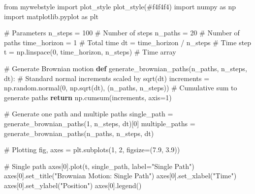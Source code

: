 \documentclass[
  letterpaper,
  DIV=11,
  numbers=noendperiod]{scrartcl}
\newenvironment{Shaded}{\begin{snugshade}}{\end{snugshade}}
\newcommand{\CommentTok}[1]{\textcolor[rgb]{0.37,0.37,0.37}{#1}}
\newcommand{\ControlFlowTok}[1]{\textcolor[rgb]{0.00,0.23,0.31}{\textbf{#1}}}
\newcommand{\DecValTok}[1]{\textcolor[rgb]{0.68,0.00,0.00}{#1}}
\newcommand{\FloatTok}[1]{\textcolor[rgb]{0.68,0.00,0.00}{#1}}
\newcommand{\ImportTok}[1]{\textcolor[rgb]{0.00,0.46,0.62}{#1}}
\newcommand{\KeywordTok}[1]{\textcolor[rgb]{0.00,0.23,0.31}{\textbf{#1}}}
\newcommand{\NormalTok}[1]{\textcolor[rgb]{0.00,0.23,0.31}{#1}}
\newcommand{\OperatorTok}[1]{\textcolor[rgb]{0.37,0.37,0.37}{#1}}
\newcommand{\StringTok}[1]{\textcolor[rgb]{0.13,0.47,0.30}{#1}}
\begin{document}
\begin{Shaded}
\begin{Highlighting}[]
\ImportTok{from}\NormalTok{ mywebstyle }\ImportTok{import}\NormalTok{ plot\_style}
\NormalTok{plot\_style(}\StringTok{\textquotesingle{}\#f4f4f4\textquotesingle{}}\NormalTok{)}
\ImportTok{import}\NormalTok{ numpy }\ImportTok{as}\NormalTok{ np}
\ImportTok{import}\NormalTok{ matplotlib.pyplot }\ImportTok{as}\NormalTok{ plt}

\CommentTok{\# Parameters}
\NormalTok{n\_steps }\OperatorTok{=} \DecValTok{100}  \CommentTok{\# Number of steps}
\NormalTok{n\_paths }\OperatorTok{=} \DecValTok{20}   \CommentTok{\# Number of paths}
\NormalTok{time\_horizon }\OperatorTok{=} \DecValTok{1}  \CommentTok{\# Total time}
\NormalTok{dt }\OperatorTok{=}\NormalTok{ time\_horizon }\OperatorTok{/}\NormalTok{ n\_steps  }\CommentTok{\# Time step}
\NormalTok{t }\OperatorTok{=}\NormalTok{ np.linspace(}\DecValTok{0}\NormalTok{, time\_horizon, n\_steps)  }\CommentTok{\# Time array}

\CommentTok{\# Generate Brownian motion}
\KeywordTok{def}\NormalTok{ generate\_brownian\_paths(n\_paths, n\_steps, dt):}
    \CommentTok{\# Standard normal increments scaled by sqrt(dt)}
\NormalTok{    increments }\OperatorTok{=}\NormalTok{ np.random.normal(}\DecValTok{0}\NormalTok{, np.sqrt(dt), (n\_paths, n\_steps))}
    \CommentTok{\# Cumulative sum to generate paths}
    \ControlFlowTok{return}\NormalTok{ np.cumsum(increments, axis}\OperatorTok{=}\DecValTok{1}\NormalTok{)}

\CommentTok{\# Generate one path and multiple paths}
\NormalTok{single\_path }\OperatorTok{=}\NormalTok{ generate\_brownian\_paths(}\DecValTok{1}\NormalTok{, n\_steps, dt)[}\DecValTok{0}\NormalTok{]}
\NormalTok{multiple\_paths }\OperatorTok{=}\NormalTok{ generate\_brownian\_paths(n\_paths, n\_steps, dt)}

\CommentTok{\# Plotting}
\NormalTok{fig, axes }\OperatorTok{=}\NormalTok{ plt.subplots(}\DecValTok{1}\NormalTok{, }\DecValTok{2}\NormalTok{, figsize}\OperatorTok{=}\NormalTok{(}\FloatTok{7.9}\NormalTok{, }\FloatTok{3.9}\NormalTok{))}

\CommentTok{\# Single path}
\NormalTok{axes[}\DecValTok{0}\NormalTok{].plot(t, single\_path, label}\OperatorTok{=}\StringTok{"Single Path"}\NormalTok{)}
\NormalTok{axes[}\DecValTok{0}\NormalTok{].set\_title(}\StringTok{"Brownian Motion: Single Path"}\NormalTok{)}
\NormalTok{axes[}\DecValTok{0}\NormalTok{].set\_xlabel(}\StringTok{"Time"}\NormalTok{)}
\NormalTok{axes[}\DecValTok{0}\NormalTok{].set\_ylabel(}\StringTok{"Position"}\NormalTok{)}
\NormalTok{axes[}\DecValTok{0}\NormalTok{].legend()}


\end{Highlighting}
\end{Shaded}
\end{document}
